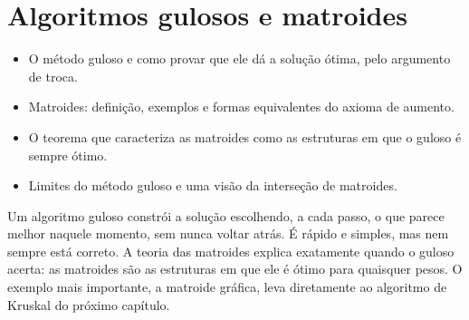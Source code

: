 \chapter{Algoritmos gulosos e matroides}\label{cap:gulosos}
\begin{objetivos}
\begin{itemize}
  \item O método guloso e como provar que ele dá a solução ótima, pelo argumento de troca.
  \item Matroides: definição, exemplos e formas equivalentes do axioma de aumento.
  \item O teorema que caracteriza as matroides como as estruturas em que o guloso é sempre ótimo.
  \item Limites do método guloso e uma visão da interseção de matroides.
\end{itemize}
\end{objetivos}

Um algoritmo guloso constrói a solução escolhendo, a cada passo, o que parece melhor naquele momento, sem nunca voltar atrás. É rápido e simples, mas nem sempre está correto. A teoria das matroides explica exatamente quando o guloso acerta: as matroides são as estruturas em que ele é ótimo para quaisquer pesos. O exemplo mais importante, a matroide gráfica, leva diretamente ao algoritmo de Kruskal do próximo capítulo.

